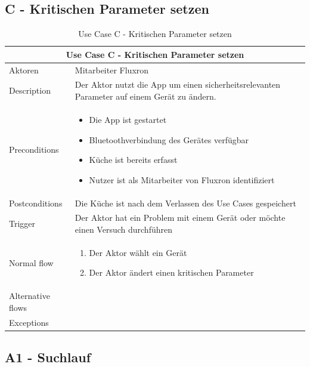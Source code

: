 \subsection{C - Kritischen Parameter setzen}
\label{subsec:C - Kritischen Parameter setzen}

\begin{table}[H]
\begin{tabular}{|p{3cm}|p{10cm}|}
  \hline
  \multicolumn{2}{|c|}{Use Case C - Kritischen Parameter setzen}
  \\\hline
  	Aktoren
  &
  	Mitarbeiter Fluxron
  \\\hline
  	Description 
  &
  	Der Aktor nutzt die App um einen sicherheitsrelevanten Parameter auf einem Gerät zu ändern.
  \\\hline
  	Preconditions 
  & 
  	\begin{itemize}
	  \item Die App ist gestartet
	  \item Bluetoothverbindung des Gerätes verfügbar
	  \item Küche ist bereits erfasst
      \item Nutzer ist als Mitarbeiter von Fluxron identifiziert
  	\end{itemize}
  \\\hline
  	Postconditions
  &
    Die Küche ist nach dem Verlassen des Use Cases gespeichert
  \\\hline
  	Trigger
  &
    Der Aktor hat ein Problem mit einem Gerät oder möchte einen Versuch durchführen
  \\\hline
  	Normal flow
  &
	\begin{enumerate}
	  \item Der Aktor wählt ein Gerät
 	  \item Der Aktor ändert einen kritischen Parameter
	\end{enumerate}
  \\\hline
    Alternative flows
  &

  \\\hline
    Exceptions
  &
    
  \\\hline
\end{tabular}
\caption{Use Case C - Kritischen Parameter setzen}
\end{table}

\subsection{A1 - Suchlauf}
\label{subsec:A1 - Suchlauf}

